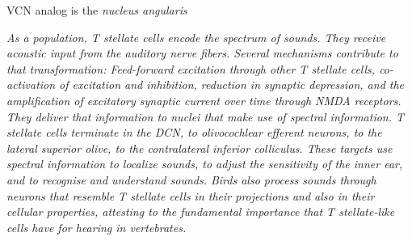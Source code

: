 
























\label{sec-1_7}

















VCN analog is the \emph{nucleus angularis}
\label{sec-1_8}


{\it As a population, T stellate cells encode the spectrum of sounds. They
receive acoustic input from the auditory nerve fibers. Several
mechanisms contribute to that transformation: Feed-forward excitation
through other T stellate cells, co-activation of excitation and
inhibition, reduction in synaptic depression, and the amplification of
excitatory synaptic current over time through NMDA receptors. They
deliver that information to nuclei that make use of spectral
information.  T stellate cells terminate in the DCN, to olivocochlear
efferent neurons, to the lateral superior olive, to the contralateral
inferior colliculus. These targets use spectral information to
localize sounds, to adjust the sensitivity of the inner ear, and to
recognise and understand sounds. Birds also process sounds through
neurons that resemble T stellate cells in their projections and also
in their cellular properties, attesting to the fundamental importance
that T stellate-like cells have for hearing in vertebrates.}




